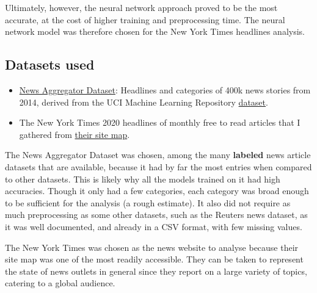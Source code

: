\documentclass[11pt]{article}
\begin{document}
Ultimately, however, the neural network approach proved to be the most
accurate, at the cost of higher training and preprocessing time. The neural
network model was therefore chosen for the New York Times headlines analysis.

\subsection*{Datasets used}

\begin{itemize}
\item
\href{https://www.kaggle.com/uciml/news-aggregator-dataset}
{News Aggregator Dataset}:
Headlines and categories of 400k news stories from 2014,
derived from the UCI Machine Learning Repository
\href{http://archive.ics.uci.edu/ml/datasets/News+Aggregator}{dataset}.
\item
The New York Times 2020 headlines of monthly free to read articles that I
gathered from
\href{https://spiderbites.nytimes.com/2020/}
{their site map}.
\end{itemize}

The News Aggregator Dataset was chosen, among the many \textbf{labeled} news
article datasets that are available, because it had by far the most entries
when compared to other datasets. This is likely why all the models trained on
it had high accuracies. Though it only had a few categories, each category
was broad enough to be sufficient for the analysis (a rough estimate). It
also did not require as much preprocessing as some other datasets, such as
the Reuters news dataset, as it was well documented, and already in a CSV
format, with few missing values.

The New York Times was chosen as the news website to analyse because their
site map was one of the most readily accessible. They can be taken
to represent the state of news outlets in general since they report on a
large variety of topics, catering to a global audience.
\end{document}
